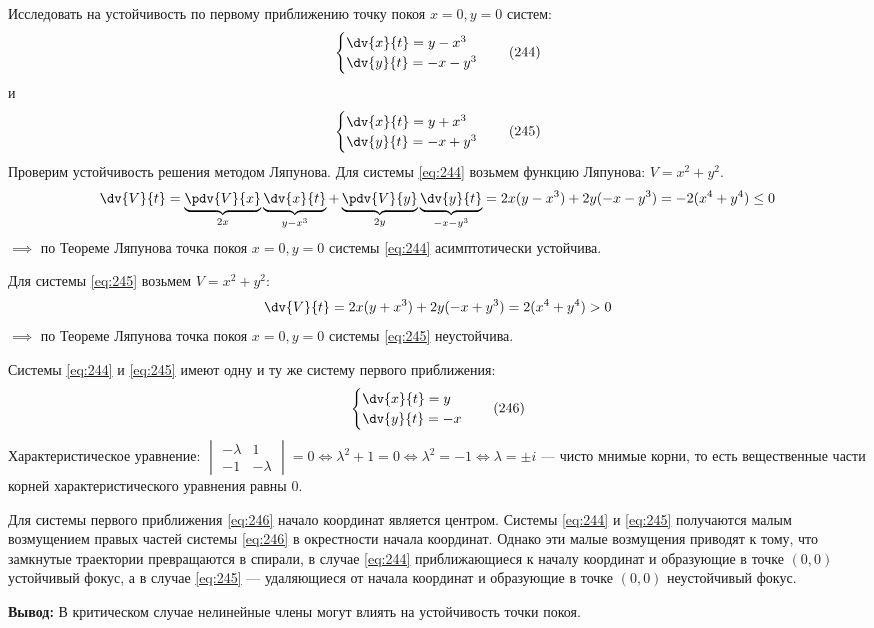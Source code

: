 \begin{example}
	Исследовать на устойчивость по первому приближению точку покоя $x=0, y=0$ систем:
	\begin{equation} \label{eq:244}
		\begin{cases}
			\dv{x}{t} = y - x^3 \\
			\dv{y}{t} = -x - y^3
		\end{cases} \quad (244)
	\end{equation}
	и
	\begin{equation} \label{eq:245}
		\begin{cases}
			\dv{x}{t} = y + x^3 \\
			\dv{y}{t} = -x + y^3
		\end{cases} \quad (245)
	\end{equation}
	Проверим устойчивость решения методом Ляпунова. Для системы \eqref{eq:244} возьмем функцию Ляпунова: $V = x^2 + y^2$.
	\begin{equation*}
		\dv{V}{t} = \underbrace{\pdv{V}{x}}_{2x} \underbrace{\dv{x}{t}}_{y-x^3} + \underbrace{\pdv{V}{y}}_{2y} \underbrace{\dv{y}{t}}_{-x-y^3} = 2x(y-x^3) + 2y(-x-y^3) = -2(x^4+y^4) \le 0
	\end{equation*}
	$\implies$ по Теореме Ляпунова точка покоя $x=0, y=0$ системы \eqref{eq:244} асимптотически устойчива.
	
	Для системы \eqref{eq:245} возьмем $V = x^2 + y^2$:
	\begin{equation*}
		\dv{V}{t} = 2x(y+x^3) + 2y(-x+y^3) = 2(x^4+y^4) > 0
	\end{equation*}
	$\implies$ по Теореме Ляпунова точка покоя $x=0, y=0$ системы \eqref{eq:245} неустойчива.
	
	Системы \eqref{eq:244} и \eqref{eq:245} имеют одну и ту же систему первого приближения:
	\begin{equation} \label{eq:246}
		\begin{cases}
			\dv{x}{t} = y \\
			\dv{y}{t} = -x
		\end{cases} \quad (246)
	\end{equation}
	Характеристическое уравнение: $\begin{vmatrix} -\lambda & 1 \\ -1 & -\lambda \end{vmatrix} = 0 \iff \lambda^2 + 1 = 0 \iff \lambda^2 = -1 \iff \lambda = \pm i$ --- чисто мнимые корни, то есть вещественные части корней характеристического уравнения равны $0$.
	
	Для системы первого приближения \eqref{eq:246} начало координат является центром. Системы \eqref{eq:244} и \eqref{eq:245} получаются малым возмущением правых частей системы \eqref{eq:246} в окрестности начала координат.
	Однако эти малые возмущения приводят к тому, что замкнутые траектории превращаются в спирали, в случае \eqref{eq:244} приближающиеся к началу координат и образующие в точке $(0,0)$ устойчивый фокус, а в случае \eqref{eq:245} --- удаляющиеся от начала координат и образующие в точке $(0,0)$ неустойчивый фокус.
	
	\textbf{Вывод:} В критическом случае нелинейные члены могут влиять на устойчивость точки покоя.
\end{example}

